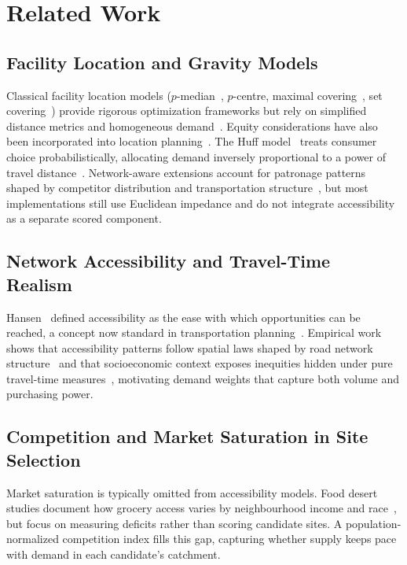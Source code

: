 \documentclass[conference]{IEEEtran}
\begin{document}
\section{Related Work}

\subsection{Facility Location and Gravity Models}

Classical facility location models ($p$-median~\cite{Hakimi1964},
$p$-centre, maximal covering~\cite{Church1974}, set
covering~\cite{Toregas1971}) provide rigorous optimization frameworks
but rely on simplified distance metrics and homogeneous
demand~\cite{ReVelle2005,Owen1998,Farahani2012,Drezner2024}. Equity
considerations have also been incorporated into location
planning~\cite{Morrill1977}. The Huff model~\cite{Huff1964} treats
consumer choice probabilistically, allocating demand inversely
proportional to a power of travel distance~\cite{Wilson1971,
Nakanishi1974,Fotheringham1983,Liang2020}.
Network-aware extensions account for patronage patterns shaped by
competitor distribution and transportation
structure~\cite{Verhetsel2022}, but most implementations
still use Euclidean impedance and do not integrate accessibility as a
separate scored component.

\subsection{Network Accessibility and Travel-Time Realism}

Hansen~\cite{Hansen1959} defined accessibility as the ease with which
opportunities can be reached, a concept now standard in transportation
planning~\cite{Geurs2004,Luo2003,Wang2012}. Empirical work shows that
accessibility patterns follow spatial laws shaped by road network
structure~\cite{Xu2020} and that socioeconomic context exposes
inequities hidden under pure travel-time measures~\cite{Kharel2024},
motivating demand weights that capture both volume and purchasing power.

\subsection{Competition and Market Saturation in Site Selection}

Market saturation is typically omitted from accessibility models.
Food desert studies document how grocery access varies by neighbourhood
income and race~\cite{Apparicio2007,Beaulac2009,VerPloeg2012}, but
focus on measuring deficits rather than scoring candidate sites. A
population-normalized competition index fills this gap, capturing
whether supply keeps pace with demand in each candidate's catchment.
\end{document}
